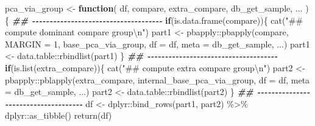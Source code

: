 \documentclass[
]{article}
\newenvironment{Shaded}{\begin{snugshade}}{\end{snugshade}}
\newcommand{\AttributeTok}[1]{\textcolor[rgb]{0.77,0.63,0.00}{#1}}
\newcommand{\ControlFlowTok}[1]{\textcolor[rgb]{0.13,0.29,0.53}{\textbf{#1}}}
\newcommand{\DecValTok}[1]{\textcolor[rgb]{0.00,0.00,0.81}{#1}}
\newcommand{\DocumentationTok}[1]{\textcolor[rgb]{0.56,0.35,0.01}{\textbf{\textit{#1}}}}
\newcommand{\FunctionTok}[1]{\textcolor[rgb]{0.00,0.00,0.00}{#1}}
\newcommand{\NormalTok}[1]{#1}
\newcommand{\OtherTok}[1]{\textcolor[rgb]{0.56,0.35,0.01}{#1}}
\newcommand{\SpecialCharTok}[1]{\textcolor[rgb]{0.00,0.00,0.00}{#1}}
\newcommand{\StringTok}[1]{\textcolor[rgb]{0.31,0.60,0.02}{#1}}
\begin{document}
\begin{Shaded}
\begin{Highlighting}[]
\NormalTok{pca\_via\_group }\OtherTok{\textless{}{-}} 
  \ControlFlowTok{function}\NormalTok{(}
\NormalTok{           df,}
\NormalTok{           compare,}
\NormalTok{           extra\_compare,}
\NormalTok{           db\_get\_sample,}
\NormalTok{           ...}
\NormalTok{           )\{}
    \DocumentationTok{\#\# {-}{-}{-}{-}{-}{-}{-}{-}{-}{-}{-}{-}{-}{-}{-}{-}{-}{-}{-}{-}{-}{-}{-}{-}{-}{-}{-}{-}{-}{-}{-}{-}{-}{-}{-}{-}{-} }
    \ControlFlowTok{if}\NormalTok{(}\FunctionTok{is.data.frame}\NormalTok{(compare))\{}
      \FunctionTok{cat}\NormalTok{(}\StringTok{"\#\# compute dominant compare group}\SpecialCharTok{\textbackslash{}n}\StringTok{"}\NormalTok{)}
\NormalTok{      part1 }\OtherTok{\textless{}{-}}\NormalTok{ pbapply}\SpecialCharTok{::}\FunctionTok{pbapply}\NormalTok{(compare, }\AttributeTok{MARGIN =} \DecValTok{1}\NormalTok{, base\_pca\_via\_group,}
                                \AttributeTok{df =}\NormalTok{ df, }\AttributeTok{meta =}\NormalTok{ db\_get\_sample,}
\NormalTok{                                ...)}
\NormalTok{      part1 }\OtherTok{\textless{}{-}}\NormalTok{ data.table}\SpecialCharTok{::}\FunctionTok{rbindlist}\NormalTok{(part1)}
\NormalTok{    \}}
    \DocumentationTok{\#\# {-}{-}{-}{-}{-}{-}{-}{-}{-}{-}{-}{-}{-}{-}{-}{-}{-}{-}{-}{-}{-}{-}{-}{-}{-}{-}{-}{-}{-}{-}{-}{-}{-}{-}{-}{-}{-} }
    \ControlFlowTok{if}\NormalTok{(}\FunctionTok{is.list}\NormalTok{(extra\_compare))\{}
      \FunctionTok{cat}\NormalTok{(}\StringTok{"\#\# compute extra compare group}\SpecialCharTok{\textbackslash{}n}\StringTok{"}\NormalTok{)}
\NormalTok{      part2 }\OtherTok{\textless{}{-}}\NormalTok{ pbapply}\SpecialCharTok{::}\FunctionTok{pblapply}\NormalTok{(extra\_compare, internal\_base\_pca\_via\_group,}
                                 \AttributeTok{df =}\NormalTok{ df, }\AttributeTok{meta =}\NormalTok{ db\_get\_sample,}
\NormalTok{                                 ...)}
\NormalTok{      part2 }\OtherTok{\textless{}{-}}\NormalTok{ data.table}\SpecialCharTok{::}\FunctionTok{rbindlist}\NormalTok{(part2)}
\NormalTok{    \}}
    \DocumentationTok{\#\# {-}{-}{-}{-}{-}{-}{-}{-}{-}{-}{-}{-}{-}{-}{-}{-}{-}{-}{-}{-}{-}{-}{-}{-}{-}{-}{-}{-}{-}{-}{-}{-}{-}{-}{-}{-}{-} }
\NormalTok{    df }\OtherTok{\textless{}{-}}\NormalTok{ dplyr}\SpecialCharTok{::}\FunctionTok{bind\_rows}\NormalTok{(part1, part2) }\SpecialCharTok{\%\textgreater{}\%}
\NormalTok{      dplyr}\SpecialCharTok{::}\FunctionTok{as\_tibble}\NormalTok{()}
    \FunctionTok{return}\NormalTok{(df)}

\end{Highlighting}
\end{Shaded}
\end{document}
